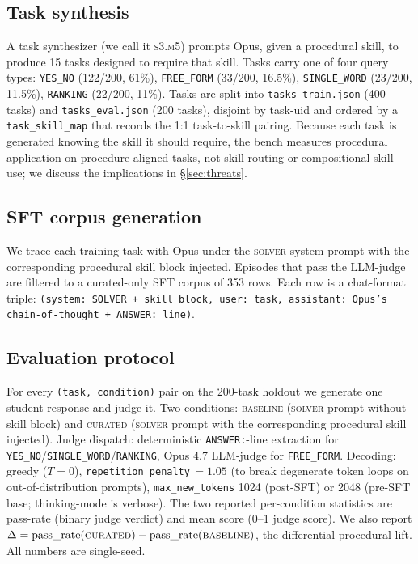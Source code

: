 \documentclass[10pt]{article}
\newcommand{\BL}{\textsc{baseline}\xspace}
\newcommand{\CU}{\textsc{curated}\xspace}
\begin{document}
\subsection{Task synthesis}
A task synthesizer (we call it \textsc{s3.m5}) prompts Opus, given a procedural skill, to produce 15 tasks designed to require that skill. Tasks carry one of four query types: \texttt{YES\_NO} (122/200, 61\%), \texttt{FREE\_FORM} (33/200, 16.5\%), \texttt{SINGLE\_WORD} (23/200, 11.5\%), \texttt{RANKING} (22/200, 11\%). Tasks are split into \texttt{tasks\_train.json} (400 tasks) and \texttt{tasks\_eval.json} (200 tasks), disjoint by task-uid and ordered by a \texttt{task\_skill\_map} that records the 1:1 task-to-skill pairing. Because each task is generated knowing the skill it should require, the bench measures procedural application on procedure-aligned tasks, not skill-routing or compositional skill use; we discuss the implications in \S\ref{sec:threats}.

\subsection{SFT corpus generation}
We trace each training task with Opus under the \textsc{solver} system prompt with the corresponding procedural skill block injected. Episodes that pass the LLM-judge are filtered to a curated-only SFT corpus of 353 rows. Each row is a chat-format triple: \texttt{(system: SOLVER + skill block, user: task, assistant: Opus's chain-of-thought + ANSWER: line)}.

\subsection{Evaluation protocol}
For every \texttt{(task, condition)} pair on the 200-task holdout we generate one student response and judge it. Two conditions: \BL{} (\textsc{solver} prompt without skill block) and \CU{} (\textsc{solver} prompt with the corresponding procedural skill injected). Judge dispatch: deterministic \texttt{ANSWER:}-line extraction for \texttt{YES\_NO}/\texttt{SINGLE\_WORD}/\texttt{RANKING}, Opus 4.7 LLM-judge for \texttt{FREE\_FORM}. Decoding: greedy ($T{=}0$), \texttt{repetition\_penalty}\,$=1.05$ (to break degenerate token loops on out-of-distribution prompts), \texttt{max\_new\_tokens} 1024 (post-SFT) or 2048 (pre-SFT base; thinking-mode is verbose). The two reported per-condition statistics are pass-rate (binary judge verdict) and mean score (0--1 judge score). We also report $\Delta = \mathrm{pass\_rate}(\CU) - \mathrm{pass\_rate}(\BL)$, the differential procedural lift. All numbers are single-seed.
\end{document}
